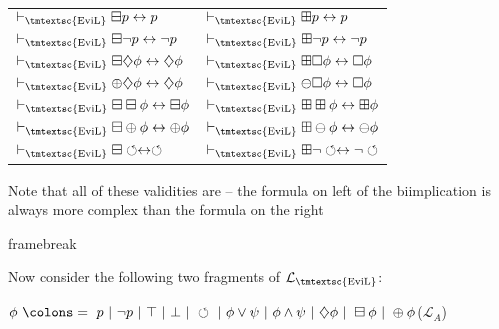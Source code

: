 \begin{center}
  \begin{tabular}{ll}
    $\vdash_{\text{\tmtextsc{EviL}}} \boxminus p \leftrightarrow p$ &
    $\vdash_{\text{\tmtextsc{EviL}}} \boxplus p \leftrightarrow p$\\
    $\vdash_{\text{\tmtextsc{EviL}}} \boxminus \neg p \leftrightarrow \neg p$
    & $\vdash_{\text{\tmtextsc{EviL}}} \boxplus \neg p \leftrightarrow \neg
    p$\\
    $\vdash_{\text{\tmtextsc{EviL}}} \boxminus \diamondsuit \phi
    \leftrightarrow \diamondsuit \phi$ & $\vdash_{\text{\tmtextsc{EviL}}}
    \boxplus \Box  \phi \leftrightarrow \Box  \phi$\\
    $\vdash_{\text{\tmtextsc{EviL}}} \oplus \diamondsuit \phi \leftrightarrow
    \diamondsuit \phi$ & $\vdash_{\text{\tmtextsc{EviL}}} \ominus \Box  \phi
    \leftrightarrow \Box  \phi$\\
    $\vdash_{\text{\tmtextsc{EviL}}} \boxminus \boxminus \phi \leftrightarrow
    \boxminus \phi$ & $\vdash_{\text{\tmtextsc{EviL}}} \boxplus \boxplus \phi
    \leftrightarrow \boxplus \phi$\\
    $\vdash_{\text{\tmtextsc{EviL}}} \boxminus \oplus \phi \leftrightarrow
    \oplus \phi$ & $\vdash_{\text{\tmtextsc{EviL}}} \boxplus \ominus \phi
    \leftrightarrow \ominus \phi$\\
    $\vdash_{\text{\tmtextsc{EviL}}} \boxminus \circlearrowleft
    \leftrightarrow \circlearrowleft$ & $\vdash_{\text{\tmtextsc{EviL}}}
    \boxplus \neg \circlearrowleft \leftrightarrow \neg \circlearrowleft$
  \end{tabular}
\end{center}

Note that all of these validities are  -- the formula on
left of the biimplication is always more complex than the formula on the right

framebreak

Now consider the following two  fragments of
$\mathcal{L}_{\text{\tmtextsc{EviL}}}$:

{\hspace*{\fill}}$\phi \text{ } \colons = \text{ } p \text{ } | \text{ } \neg
p \text{ } | \text{ } \top \text{ } | \text{ } \bot \text{ } | \text{ }
\circlearrowleft \text{ } | \text{ } \phi \vee \psi \text{ } | \text{ } \phi
\wedge \psi \text{ } | \text{ } \diamondsuit \phi \text{ } | \text{ }
\boxminus \phi \text{ } | \text{ } \oplus
\phi${\hspace*{\fill}}($\mathcal{L}_A$)

